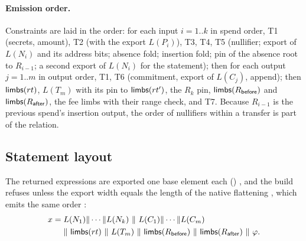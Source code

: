 \paragraph{Emission order.} Constraints are laid in the order: for each input
$i=1..k$ in spend order, T1 (secrets, amount), T2 (with the export $L(P_i)$),
T3, T4, T5 (nullifier; export of $L(N_i)$ and its address bits; absence fold;
insertion fold; pin of the absence root to $R_{i-1}$; a second export of
$L(N_i)$ for the statement); then for each output $j=1..m$ in output order, T1,
T6 (commitment, export of $L(C_j)$, append); then $\mathsf{limbs}(rt)$, $L(T_m)$ with
its pin to $\mathsf{limbs}(rt')$, the $R_k$ pin, $\mathsf{limbs}(R_{\mathsf{before}})$ and
$\mathsf{limbs}(R_{\mathsf{after}})$, the fee limbs with their range check, and T7.
Because $R_{i-1}$ is the previous spend's insertion output, the order of
nullifiers within a transfer is part of the relation.

\subsection{Statement layout}
\label{subsec:transfer-stmt}

The returned expressions are exported one base element each
() ,
and the build refuses unless the export width equals the length of the native
flattening 
, which emits the same order
:
\begin{align}
  x = {}& L(N_1)\|\cdots\|L(N_k)\ \|\ L(C_1)\|\cdots\|L(C_m) \nonumber\\
        & \|\ \limbs(rt)\ \|\ L(T_m)\ \|\ \limbs(R_{\mathsf{before}})\ \|\ \limbs(R_{\mathsf{after}})\ \|\ \varphi .
\end{align}

